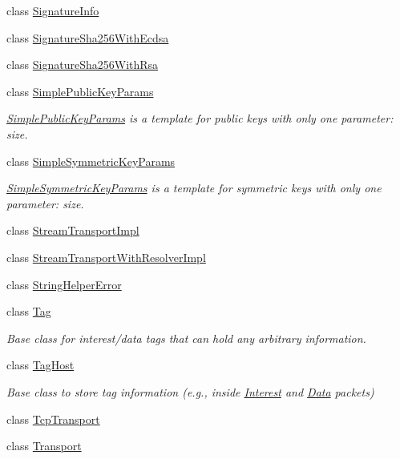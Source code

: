 \begin{DoxyCompactItemize}
class \hyperlink{classndn_1_1SignatureInfo}{Signature\+Info}
\item 
class \hyperlink{classndn_1_1SignatureSha256WithEcdsa}{Signature\+Sha256\+With\+Ecdsa}
\item 
class \hyperlink{classndn_1_1SignatureSha256WithRsa}{Signature\+Sha256\+With\+Rsa}
\item 
class \hyperlink{classndn_1_1SimplePublicKeyParams}{Simple\+Public\+Key\+Params}
\begin{DoxyCompactList}\small\item\em \hyperlink{classndn_1_1SimplePublicKeyParams}{Simple\+Public\+Key\+Params} is a template for public keys with only one parameter\+: size. \end{DoxyCompactList}\item 
class \hyperlink{classndn_1_1SimpleSymmetricKeyParams}{Simple\+Symmetric\+Key\+Params}
\begin{DoxyCompactList}\small\item\em \hyperlink{classndn_1_1SimpleSymmetricKeyParams}{Simple\+Symmetric\+Key\+Params} is a template for symmetric keys with only one parameter\+: size. \end{DoxyCompactList}\item 
class \hyperlink{classndn_1_1StreamTransportImpl}{Stream\+Transport\+Impl}
\item 
class \hyperlink{classndn_1_1StreamTransportWithResolverImpl}{Stream\+Transport\+With\+Resolver\+Impl}
\item 
class \hyperlink{classndn_1_1StringHelperError}{String\+Helper\+Error}
\item 
class \hyperlink{classndn_1_1Tag}{Tag}
\begin{DoxyCompactList}\small\item\em Base class for interest/data tags that can hold any arbitrary information. \end{DoxyCompactList}\item 
class \hyperlink{classndn_1_1TagHost}{Tag\+Host}
\begin{DoxyCompactList}\small\item\em Base class to store tag information (e.\+g., inside \hyperlink{classndn_1_1Interest}{Interest} and \hyperlink{classndn_1_1Data}{Data} packets) \end{DoxyCompactList}\item 
class \hyperlink{classndn_1_1TcpTransport}{Tcp\+Transport}
\item 
class \hyperlink{classndn_1_1Transport}{Transport}
\item 

\end{DoxyCompactItemize}
